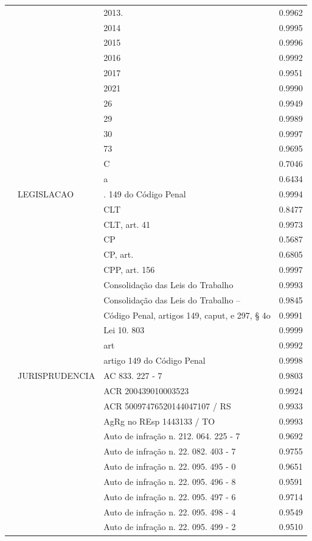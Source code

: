 \begin{table}
\begin{tabular}{llp{6cm}r}
 &  & 2013. & 0.9962 \\
 &  & 2014 & 0.9995 \\
 &  & 2015 & 0.9996 \\
 &  & 2016 & 0.9992 \\
 &  & 2017 & 0.9951 \\
 &  & 2021 & 0.9990 \\
 &  & 26 & 0.9949 \\
 &  & 29 & 0.9989 \\
 &  & 30 & 0.9997 \\
 &  & 73 & 0.9695 \\
 &  & C & 0.7046 \\
 &  & a & 0.6434 \\
 & LEGISLACAO & . 149 do Código Penal & 0.9994 \\
 &  & CLT & 0.8477 \\
 &  & CLT, art. 41 & 0.9973 \\
 &  & CP & 0.5687 \\
 &  & CP, art. & 0.6805 \\
 &  & CPP, art. 156 & 0.9997 \\
 &  & Consolidação das Leis do Trabalho & 0.9993 \\
 &  & Consolidação das Leis do Trabalho – & 0.9845 \\
 &  & Código Penal, artigos 149, caput, e 297, § 4o & 0.9991 \\
 &  & Lei 10. 803 & 0.9999 \\
 &  & art & 0.9992 \\
 &  & artigo 149 do Código Penal & 0.9998 \\
 & JURISPRUDENCIA & AC 833. 227 - 7 & 0.9803 \\
 &  & ACR 200439010003523 & 0.9924 \\
 &  & ACR 50097476520144047107 / RS & 0.9933 \\
 &  & AgRg no REsp 1443133 / TO & 0.9993 \\
 &  & Auto de infração n. 212. 064. 225 - 7 & 0.9692 \\
 &  & Auto de infração n. 22. 082. 403 - 7 & 0.9755 \\
 &  & Auto de infração n. 22. 095. 495 - 0 & 0.9651 \\
 &  & Auto de infração n. 22. 095. 496 - 8 & 0.9591 \\
 &  & Auto de infração n. 22. 095. 497 - 6 & 0.9714 \\
 &  & Auto de infração n. 22. 095. 498 - 4 & 0.9549 \\
 &  & Auto de infração n. 22. 095. 499 - 2 & 0.9510 \\

\end{tabular}
\end{table}
